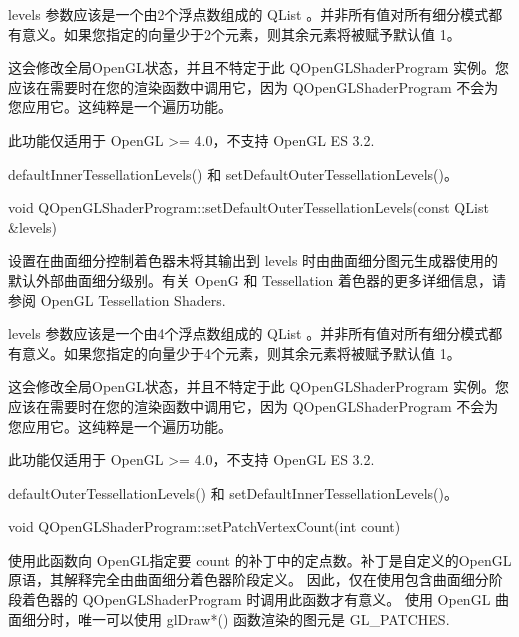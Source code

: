 levels 参数应该是一个由2个浮点数组成的 QList 。并非所有值对所有细分模式都有意义。如果您指定的向量少于2个元素，则其余元素将被赋予默认值 1。

\begin{notice}
这会修改全局OpenGL状态，并且不特定于此 QOpenGLShaderProgram 实例。您应该在需要时在您的渲染函数中调用它，因为 QOpenGLShaderProgram 不会为您应用它。这纯粹是一个遍历功能。
\end{notice}

\begin{notice}
此功能仅适用于 OpenGL >= 4.0，不支持 OpenGL ES 3.2.
\end{notice}



\begin{seeAlso}
defaultInnerTessellationLevels() 和 setDefaultOuterTessellationLevels()。
\end{seeAlso}

void QOpenGLShaderProgram::setDefaultOuterTessellationLevels(const QList \&levels)

设置在曲面细分控制着色器未将其输出到 levels 时由曲面细分图元生成器使用的默认外部曲面细分级别。有关 OpenG 和 Tessellation 着色器的更多详细信息，请参阅 OpenGL Tessellation Shaders.

levels 参数应该是一个由4个浮点数组成的 QList 。并非所有值对所有细分模式都有意义。如果您指定的向量少于4个元素，则其余元素将被赋予默认值 1。

\begin{notice}
这会修改全局OpenGL状态，并且不特定于此 QOpenGLShaderProgram 实例。您应该在需要时在您的渲染函数中调用它，因为 QOpenGLShaderProgram 不会为您应用它。这纯粹是一个遍历功能。
\end{notice}

\begin{notice}
此功能仅适用于 OpenGL >= 4.0，不支持 OpenGL ES 3.2.
\end{notice}


\begin{seeAlso}
defaultOuterTessellationLevels() 和 setDefaultInnerTessellationLevels()。
\end{seeAlso}

void QOpenGLShaderProgram::setPatchVertexCount(int count)

使用此函数向 OpenGL指定要 count 的补丁中的定点数。补丁是自定义的OpenGL原语，其解释完全由曲面细分着色器阶段定义。 因此，仅在使用包含曲面细分阶段着色器的 QOpenGLShaderProgram 时调用此函数才有意义。 使用 OpenGL 曲面细分时，唯一可以使用 glDraw*() 函数渲染的图元是 GL\_PATCHES.

